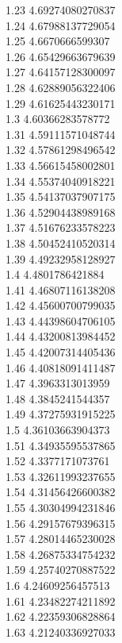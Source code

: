 {1.23	4.69274080270837\\
1.24	4.67988137729054\\
1.25	4.6670666599307\\
1.26	4.65429663679639\\
1.27	4.64157128300097\\
1.28	4.62889056322406\\
1.29	4.61625443230171\\
1.3	4.60366283578772\\
1.31	4.59111571048744\\
1.32	4.57861298496542\\
1.33	4.56615458002801\\
1.34	4.55374040918221\\
1.35	4.54137037907175\\
1.36	4.52904438989168\\
1.37	4.51676233578223\\
1.38	4.50452410520314\\
1.39	4.49232958128927\\
1.4	4.4801786421884\\
1.41	4.46807116138208\\
1.42	4.45600700799035\\
1.43	4.44398604706105\\
1.44	4.43200813984452\\
1.45	4.42007314405436\\
1.46	4.40818091411487\\
1.47	4.3963313013959\\
1.48	4.3845241544357\\
1.49	4.37275931915225\\
1.5	4.36103663904373\\
1.51	4.34935595537865\\
1.52	4.3377171073761\\
1.53	4.32611993237655\\
1.54	4.31456426600382\\
1.55	4.30304994231846\\
1.56	4.29157679396315\\
1.57	4.28014465230028\\
1.58	4.26875334754232\\
1.59	4.25740270887522\\
1.6	4.24609256457513\\
1.61	4.23482274211892\\
1.62	4.22359306828864\\
1.63	4.21240336927033\\
}
